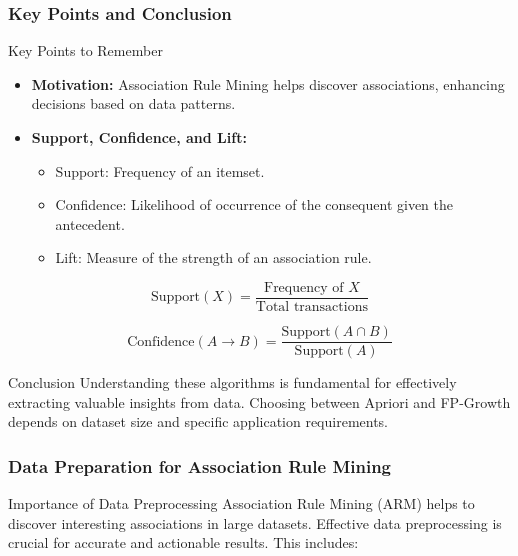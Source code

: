 \documentclass[aspectratio=169]{beamer}
\begin{document}
\begin{frame}[fragile]
    \frametitle{Key Points and Conclusion}
    
    \begin{block}{Key Points to Remember}
        \begin{itemize}
            \item \textbf{Motivation:} Association Rule Mining helps discover associations, enhancing decisions based on data patterns.
            \item \textbf{Support, Confidence, and Lift:}
            \begin{itemize}
                \item Support: Frequency of an itemset.
                \item Confidence: Likelihood of occurrence of the consequent given the antecedent.
                \item Lift: Measure of the strength of an association rule.
            \end{itemize}
        \end{itemize}

        \begin{equation}
            \text{Support}(X) = \frac{\text{Frequency of } X}{\text{Total transactions}}
        \end{equation}
        
        \begin{equation}
            \text{Confidence}(A \rightarrow B) = \frac{\text{Support}(A \cap B)}{\text{Support}(A)}
        \end{equation}
    \end{block}

    \begin{block}{Conclusion}
        Understanding these algorithms is fundamental for effectively extracting valuable insights from data. Choosing between Apriori and FP-Growth depends on dataset size and specific application requirements.
    \end{block}
\end{frame}

\begin{frame}[fragile]
    \frametitle{Data Preparation for Association Rule Mining}
    \begin{block}{Importance of Data Preprocessing}
        Association Rule Mining (ARM) helps to discover interesting associations in large datasets. Effective data preprocessing is crucial for accurate and actionable results. This includes:
    \end{block}
\end{frame}
\end{document}
